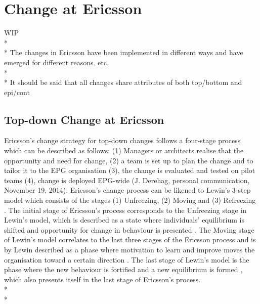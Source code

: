 \documentclass[final_report_innit.tex]{subfiles}
\begin{document}
\section{Change at Ericsson}
WIP
\\* 
\\* 
The changes in Ericsson have been implemented in different ways and have emerged for different reasons. etc.
\\* 
\\* 
It should be said that all changes share attributes of both top/bottom and epi/cont

\subsection{Top-down Change at Ericsson}
Ericsson’s change strategy for top-down changes follows a four-stage process which can be described as follows: (1) Managers or architects realise that the opportunity and need for change, (2) a team is set up to plan the change and to tailor it to the EPG organisation (3), the change is evaluated and tested on pilot teams (4), change is deployed EPG-wide (J. Derehag, personal communication, November 19, 2014). Ericsson’s change process can be likened to Lewin’s 3-step model \cite{burnes2004kurt} which consists of the stages (1) Unfreezing, (2) Moving and (3) Refreezing \cite{burnes2004kurt}. The initial stage of Ericsson’s process corresponds to the Unfreezing stage in Lewin’s model, which is described as a state where individuals’ equilibrium is shifted and opportunity for change in behaviour is presented \cite{burnes2004kurt}. The Moving stage of Lewin’s model correlates to the last three stages of the Ericsson process and is by Lewin described as a phase where motivation to learn and improve moves the organisation toward a certain direction \cite{burnes2004kurt}. The last stage of Lewin’s model is the phase where the new behaviour is fortified and a new equilibrium is formed \cite{burnes2004kurt}, which also presents itself in the last stage of Ericsson’s process. 
\\* 
\\* 
\end{document}
